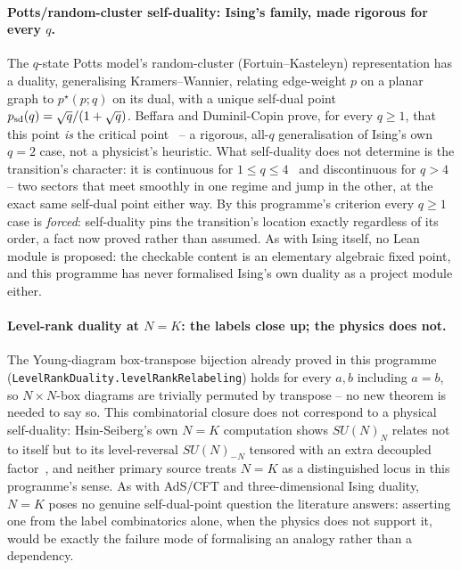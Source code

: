 \documentclass[11pt,a4paper]{article}
\newcommand{\lean}[1]{\texttt{\small #1}}
\begin{document}
\paragraph{Potts/random-cluster self-duality: Ising's family, made rigorous for every $q$.} The
$q$-state Potts model's random-cluster (Fortuin--Kasteleyn) representation has a duality, generalising
Kramers--Wannier, relating edge-weight $p$ on a planar graph to $p^\star(p;q)$ on its dual, with a
unique self-dual point $p_{\rm sd}(q)=\sqrt q/(1+\sqrt q)$. Beffara and Duminil-Copin prove, for every
$q\ge1$, that this point \emph{is} the critical point~\cite{BeffaraDuminilCopin2012} -- a rigorous,
all-$q$ generalisation of Ising's own $q=2$ case, not a physicist's heuristic. What self-duality does
not determine is the transition's character: it is continuous for $1\le q\le4$~\cite{DuminilCopinSidoraviciusTassion2017}
and discontinuous for $q>4$~\cite{DuminilCopinGagnebinHarelManolescuTassion2021} -- two sectors that
meet smoothly in one regime and jump in the other, at the exact same self-dual point either way. By
this programme's criterion every $q\ge1$ case is \emph{forced}: self-duality pins the transition's
location exactly regardless of its order, a fact now proved rather than assumed. As with Ising itself,
no Lean module is proposed: the checkable content is an elementary algebraic fixed point, and this
programme has never formalised Ising's own duality as a project module either.

\paragraph{Level-rank duality at $N=K$: the labels close up; the physics does not.} The Young-diagram
box-transpose bijection already proved in this programme (\lean{LevelRankDuality.levelRankRelabeling})
holds for every $a,b$ including $a=b$, so $N{\times}N$-box diagrams are trivially permuted by
transpose -- no new theorem is needed to say so. This combinatorial closure does not correspond to a
physical self-duality: Hsin-Seiberg's own $N=K$ computation shows $SU(N)_N$ relates not to itself but
to its level-reversal $SU(N)_{-N}$ tensored with an extra decoupled factor~\cite{HsinSeiberg2016}, and
neither primary source treats $N=K$ as a distinguished locus in this programme's sense. As with
AdS/CFT and three-dimensional Ising duality, $N=K$ poses no genuine self-dual-point question the
literature answers: asserting one from the label combinatorics alone, when the physics does not
support it, would be exactly the failure mode of formalising an analogy rather than a dependency.



\end{document}
